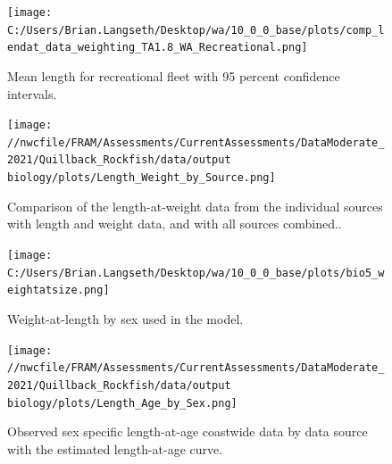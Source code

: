 \documentclass[11pt,
  english,
  a4paper,
]{article}
\begin{document}
\begin{figure}
\centering
\texttt{[image: C:/Users/Brian.Langseth/Desktop/wa/10\_0\_0\_base/plots/comp\_lendat\_data\_weighting\_TA1.8\_WA\_Recreational.png]}
\caption{Mean length for recreational fleet with 95 percent confidence intervals.\label{fig:mean-rec-len-data}}
\end{figure}

\tagmcend\tagstructend


\begin{figure}
\centering
\texttt{[image: //nwcfile/FRAM/Assessments/CurrentAssessments/DataModerate\_2021/Quillback\_Rockfish/data/output biology/plots/Length\_Weight\_by\_Source.png]}
\caption{Comparison of the length-at-weight data from the individual sources with length and weight data, and with all sources combined..\label{fig:len-weight-survey}}
\end{figure}

\tagmcend\tagstructend


\begin{figure}
\centering
\texttt{[image: C:/Users/Brian.Langseth/Desktop/wa/10\_0\_0\_base/plots/bio5\_weightatsize.png]}
\caption{Weight-at-length by sex used in the model.\label{fig:len-weight}}
\end{figure}

\tagmcend\tagstructend


\begin{figure}
\centering
\texttt{[image: //nwcfile/FRAM/Assessments/CurrentAssessments/DataModerate\_2021/Quillback\_Rockfish/data/output biology/plots/Length\_Age\_by\_Sex.png]}
\caption{Observed sex specific length-at-age coastwide data by data source with the estimated length-at-age curve.\label{fig:len-age-data}}
\end{figure}

\tagmcend\tagstructend

\end{document}
